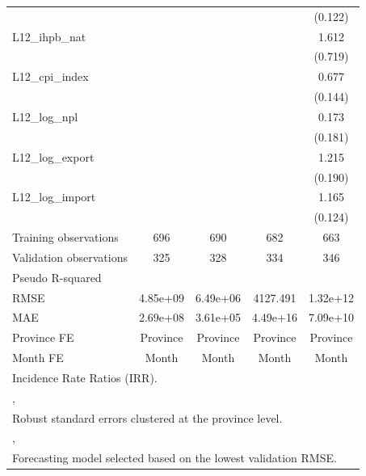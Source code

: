 {\begin{tabular}{l*{4}{c}}
                &                  &                  &                  &  (0.122)         \\
\addlinespace
L12\_ihpb\_nat    &                  &                  &                  &    1.612         \\
                &                  &                  &                  &  (0.719)         \\
\addlinespace
L12\_cpi\_index   &                  &                  &                  &    0.677\sym{*}  \\
                &                  &                  &                  &  (0.144)         \\
\addlinespace
L12\_log\_npl     &                  &                  &                  &    0.173\sym{*}  \\
                &                  &                  &                  &  (0.181)         \\
\addlinespace
L12\_log\_export  &                  &                  &                  &    1.215         \\
                &                  &                  &                  &  (0.190)         \\
\addlinespace
L12\_log\_import  &                  &                  &                  &    1.165         \\
                &                  &                  &                  &  (0.124)         \\
\midrule
Training observations&      696         &      690         &      682         &      663         \\
Validation observations&      325         &      328         &      334         &      346         \\
Pseudo R-squared&                  &                  &                  &                  \\
RMSE            & 4.85e+09         & 6.49e+06         & 4127.491         & 1.32e+12         \\
MAE             & 2.69e+08         & 3.61e+05         & 4.49e+16         & 7.09e+10         \\
Province FE     & Province         & Province         & Province         & Province         \\
Month FE        &    Month         &    Month         &    Month         &    Month         \\
\bottomrule
\multicolumn{5}{l}{\footnotesize Incidence Rate Ratios (IRR).}\\
\multicolumn{5}{l}{\footnotesize ,}\\
\multicolumn{5}{l}{\footnotesize Robust standard errors clustered at the province level.}\\
\multicolumn{5}{l}{\footnotesize ,}\\
\multicolumn{5}{l}{\footnotesize Forecasting model selected based on the lowest validation RMSE.}\\
\end{tabular}
}
